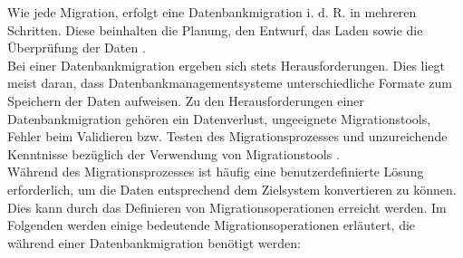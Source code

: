 Wie jede Migration, erfolgt eine Datenbankmigration i. d. R. in mehreren Schritten. Diese beinhalten die Planung, den Entwurf, das Laden sowie die Überprüfung der Daten \cite{kowalczyk2018digital}. \\
Bei einer Datenbankmigration ergeben sich stets Herausforderungen. Dies liegt meist daran, dass Datenbankmanagementsysteme unterschiedliche Formate zum Speichern der Daten aufweisen. Zu den Herausforderungen einer Datenbankmigration gehören ein Datenverlust, ungeeignete Migrationstools, Fehler beim Validieren bzw. Testen des Migrationsprozesses und unzureichende Kenntnisse bezüglich der Verwendung von Migrationstools \cite{kasonde2018seamless}. \\
Während des Migrationsprozesses ist häufig eine benutzerdefinierte Lösung erforderlich, um die Daten entsprechend dem Zielsystem konvertieren zu können. Dies kann durch das Definieren von Migrationsoperationen erreicht werden. Im Folgenden werden einige bedeutende Migrationsoperationen erläutert, die während einer Datenbankmigration benötigt werden:
